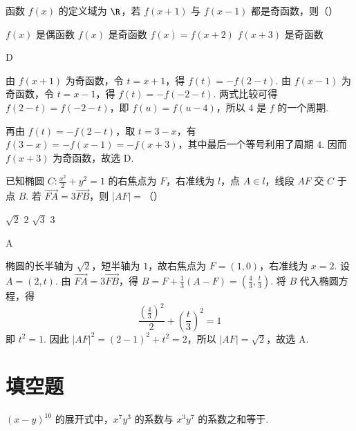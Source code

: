 \begin{problem}
函数 \( f(x) \) 的定义域为 \( \R \)，若 \( f(x + 1) \) 与 \( f(x - 1) \) 都是奇函数，则（\quad）

\choices
    {\(f(x)\) 是偶函数}
    {\(f(x)\) 是奇函数}
    {\(f(x) = f(x + 2)\)}
    {\(f(x + 3)\) 是奇函数}
\end{problem}

\begin{answer}
D
\end{answer}

\begin{solution}
由 \(f(x+1)\) 为奇函数，令 \(t=x+1\)，得
\(f(t)=-f(2-t)\). 由 \(f(x-1)\) 为奇函数，令 \(t=x-1\)，得
\(f(t)=-f(-2-t)\). 两式比较可得 \(f(2-t)=f(-2-t)\)，即
\(f(u)=f(u-4)\)，所以 \(4\) 是 \(f\) 的一个周期.

再由 \(f(t)=-f(2-t)\)，取 \(t=3-x\)，有
\(f(3-x)=-f(x-1)=-f(x+3)\)，其中最后一个等号利用了周期 \(4\). 因而
\(f(x+3)\) 为奇函数，故选 D.
\end{solution}

\begin{problem}
已知椭圆 \(C: \frac{x^2}{2} + y^2 = 1\) 的右焦点为 \(F\)，右准线为 \(l\)，点 \(A \in l\)，线段 \(AF\) 交 \(C\) 于点 \(B\). 若 \(\overrightarrow{FA} = 3\overrightarrow{FB}\)，则 \(\left|AF\right| =\)（\quad）

\choices
    {\(\sqrt{2}\)}
    {\(2\)}
    {\(\sqrt{3}\)}
    {\(3\)}
\end{problem}

\begin{answer}
A
\end{answer}

\begin{solution}
椭圆的长半轴为 \(\sqrt2\)，短半轴为 \(1\)，故右焦点为 \(F=(1,0)\)，右准线为 \(x=2\). 设 \(A=(2,t)\). 由
\(\overrightarrow{FA}=3\overrightarrow{FB}\)，得
\(B=F+\frac13(A-F)=\left(\frac43,\frac{t}{3}\right)\).
将 \(B\) 代入椭圆方程，得
\[
\frac{(\frac{4}{3})^2}{2}+\left(\frac{t}{3}\right)^2=1
\]
即 \(t^2=1\). 因此
\(\lvert AF\rvert^2=(2-1)^2+t^2=2\)，所以 \(\lvert AF\rvert=\sqrt2\)，故选 A.
\end{solution}

\section{填空题}

\begin{problem}
\((x - y)^{10}\) 的展开式中，\(x^{7}y^{3}\) 的系数与 \(x^{3}y^{7}\) 的系数之和等于\fillinblank{}.
\end{problem}

